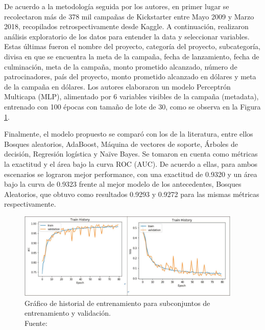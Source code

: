 De acuerdo a la metodología seguida por los autores, en primer lugar se recolectaron más de 378 mil campañas de Kickstarter entre Mayo 2009 y Marzo 2018, recopilados retrospectivamente desde Kaggle. A continuación, realizaron análisis exploratorio de los datos para entender la data y seleccionar variables. Estas últimas fueron el nombre del proyecto, categoría del proyecto, subcategoría, divisa en que se encuentra la meta de la campaña, fecha de lanzamiento, fecha de culminación, meta de la campaña, monto prometido alcanzado, número de patrocinadores, país del proyecto, monto prometido alcanzado en dólares y meta de la campaña en dólares. Los autores elaboraron un modelo Perceptrón Multicapa (MLP), alimentado por 6 variables visibles de la campaña (metadata), entrenado con 100 épocas con tamaño de lote de 30, como se observa en la Figura \ref{2:fig122}.

Finalmente, el modelo propuesto se comparó con los de la literatura, entre ellos Bosques aleatorios, AdaBoost, Máquina de vectores de soporte, Árboles de decisión, Regresión logística y Naïve Bayes.
Se tomaron en cuenta como métricas la exactitud y el área bajo la curva ROC (AUC). De acuerdo a ellas, para ambos escenarios se lograron mejor performance, con una exactitud de 0.9320 y un área bajo la curva de 0.9323 frente al mejor modelo de los antecedentes, Bosques Aleatorios, que obtuvo como resultados 0.9293 y 0.9272 para las mismas métricas respectivamente.

\begin{figure}[!ht]
	\begin{center}
		\includegraphics[width=0.95\textwidth]{2/figures/yu2018.jpg}
		\caption[Gráfico de historial de entrenamiento para subconjuntos de entrenamiento y validación]{Gráfico de historial de entrenamiento para subconjuntos de entrenamiento y validación.\\
			Fuente: \cite{pr_yu2018deeplearning}}
		\label{2:fig122}
	\end{center}
\end{figure}


